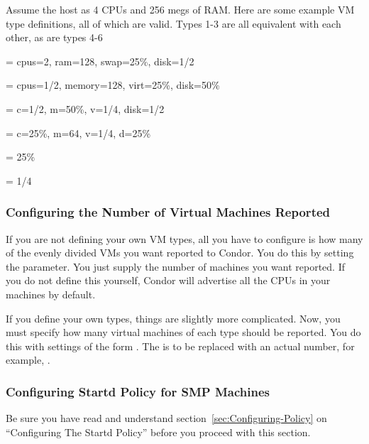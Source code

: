 Assume the host as 4 CPUs and 256 megs of RAM.
Here are some example VM type definitions, all of which are valid. 
Types 1-3 are all equivalent with each other, as are types 4-6

 = cpus=2, ram=128, swap=25\%, disk=1/2

 = cpus=1/2, memory=128, virt=25\%, disk=50\%

 = c=1/2, m=50\%, v=1/4, disk=1/2

 = c=25\%, m=64, v=1/4, d=25\%

 = 25\%

 = 1/4


\subsubsection{\label{sec:Config-VM-Number}
Configuring the Number of Virtual Machines Reported}

If you are not defining your own VM types, all you have to configure
is how many of the evenly divided VMs you want reported to Condor.
You do this by setting the  parameter.
You just supply the number of machines you want reported.
If you do not define this yourself, Condor will advertise all the CPUs
in your machines by default.

If you define your own types, things are slightly more complicated.  
Now, you must specify how many virtual machines of each type should be
reported.
You do this with settings of the form
.
The  is to be replaced with an actual number, for example, 
. 


\subsubsection{\label{sec:Config-SMP-Policy}
Configuring Startd Policy for SMP Machines}

\Note Be sure you have read and understand
section~\ref{sec:Configuring-Policy} on ``Configuring The Startd
Policy'' before you proceed with this section.

